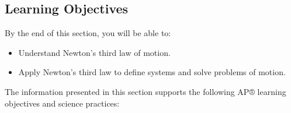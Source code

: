 \documentclass[
]{book}
\providecommand{\tightlist}{%
  \setlength{\itemsep}{0pt}\setlength{\parskip}{0pt}}
\newenvironment{learning-objectives}{}{}
\begin{document}
\hypertarget{fs-id2242736}{}
\begin{learning-objectives}

\hypertarget{learning-objectives-15}{%
\subsection{Learning Objectives}\label{learning-objectives-15}}

By the end of this section, you will be able to:

\begin{itemize}
\tightlist
\item
  Understand Newton's third law of motion.
\item
  Apply Newton's third law to define systems and solve problems of
  motion.
\end{itemize}

The information presented in this section supports the following AP®
learning objectives and science practices:


\end{learning-objectives}
\end{document}
